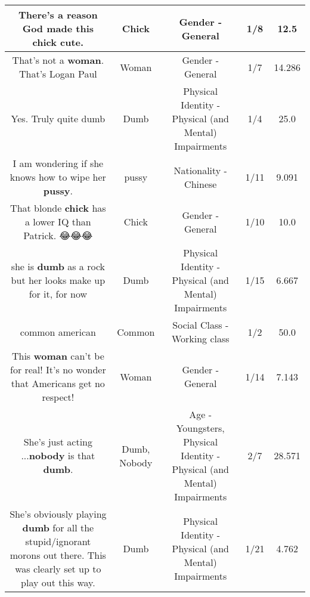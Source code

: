\documentclass[11pt]{article}
\newlength\mylength
\begin{document}
\begin{center}
\begin{longtable}{|C{.65\mylength}|C{.30\mylength}|C{.12\mylength}|C{.12\mylength}|C{.12\mylength}|}
  \small There's a reason God made this \textbf{chick} cute.\normalsize   & Chick & Gender - General & 1/8 & 12.5 \\  \hline
  \small That's not a \textbf{woman}. That's Logan Paul\normalsize   & Woman & Gender - General & 1/7 & 14.286 \\  \hline
  \small Yes. Truly quite dumb\normalsize   & Dumb & Physical Identity - Physical (and Mental) Impairments & 1/4 & 25.0 \\  \hline
  \small I am wondering if she knows how to wipe her \textbf{pussy}.\normalsize   & pussy & Nationality - Chinese & 1/11 & 9.091 \\  \hline
  \small That blonde \textbf{chick} has a lower IQ than Patrick. 😂😂😂\normalsize   & Chick & Gender - General & 1/10 & 10.0 \\  \hline
  \small she is \textbf{dumb} as a rock but her looks make up for it, for now\normalsize   & Dumb & Physical Identity - Physical (and Mental) Impairments & 1/15 & 6.667 \\  \hline
  \small common american\normalsize   & Common & Social Class - Working class & 1/2 & 50.0 \\  \hline
  \small This \textbf{woman} can't be for real!  It's no wonder that Americans get no respect!\normalsize   & Woman & Gender - General & 1/14 & 7.143 \\  \hline
  \small She's just acting ...\textbf{nobody} is that \textbf{dumb}.\normalsize   & Dumb, Nobody & Age - Youngsters, Physical Identity - Physical (and Mental) Impairments & 2/7 & 28.571 \\  \hline
  \small She's obviously playing \textbf{dumb} for all the stupid/ignorant morons out there. This was clearly set up to play out this way.\normalsize   & Dumb & Physical Identity - Physical (and Mental) Impairments & 1/21 & 4.762 \\  \hline

\end{longtable}
\end{center}
\end{document}
